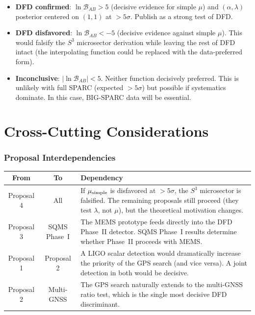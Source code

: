 \documentclass[11pt]{article}
\begin{document}
\begin{itemize}
\item \textbf{DFD confirmed}: $\ln \mathcal{B}_{AB} > 5$ (decisive
  evidence for simple $\mu$) and $(\alpha, \lambda)$ posterior centered
  on $(1, 1)$ at $> 5\sigma$. Publish as a strong test of DFD.
\item \textbf{DFD disfavored}: $\ln \mathcal{B}_{AB} < -5$ (decisive
  evidence against simple $\mu$). This would falsify the $S^3$
  microsector derivation while leaving the rest of DFD intact
  (the interpolating function could be replaced with the data-preferred
  form).
\item \textbf{Inconclusive}: $|\ln \mathcal{B}_{AB}| < 5$. Neither
  function decisively preferred. This is unlikely with full SPARC
  (expected $>5\sigma$) but possible if systematics dominate. In this
  case, BIG-SPARC data will be essential.
\end{itemize}


\newpage
\part{Cross-Cutting Considerations}
\label{part:crosscut}

\section{Proposal Interdependencies}

\begin{center}
\renewcommand{\arraystretch}{1.3}
\begin{tabular}{@{}ccp{8cm}@{}}
\toprule
\textbf{From} & \textbf{To} & \textbf{Dependency} \\
\midrule
Proposal 4 & All & If $\mu_{\rm simple}$ is disfavored at $>5\sigma$,
the $S^3$ microsector is falsified. The remaining proposals still
proceed (they test $\lambda$, not $\mu$), but the theoretical
motivation changes. \\
Proposal 3 & SQMS Phase~I & The MEMS prototype feeds directly into
the DFD Phase~II detector. SQMS Phase~I results determine whether
Phase~II proceeds with MEMS. \\
Proposal 1 & Proposal 2 & A LIGO scalar detection would dramatically
increase the priority of the GPS search (and vice versa). A joint
detection in both would be decisive. \\
Proposal 2 & Multi-GNSS & The GPS search naturally extends to the
multi-GNSS ratio test, which is the single most decisive
DFD discriminant. \\
\bottomrule
\end{tabular}
\end{center}
\end{document}
